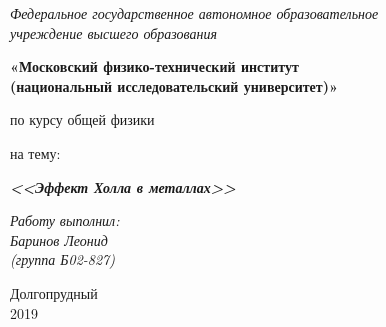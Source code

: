 \thispagestyle{empty}
\begin{center}
    \textit{Федеральное государственное автономное образовательное\\ учреждение высшего образования }

    \vspace{0.5ex}

        \textbf{«Московский физико-технический институт\\ (национальный исследовательский университет)»}
\end{center}

\vspace{10ex}

\begin{center}
    \vspace{13ex}


    \vspace{1ex}

    по курсу общей физики

    на тему:

    \textbf{\textit{<<Эффект Холла в
    металлах>>}}

    \vspace{30ex}

    \begin{flushright}
        \noindent
        \textit{Работу выполнил:}\\  
        \textit{Баринов Леонид \\(группа Б02-827)}
    \end{flushright}
    \vfill
    Долгопрудный \\2019
\newpage
\setcounter{page}{1}
\fancyhead[R]{\nouppercase{\leftmark}}	
\end{center}

